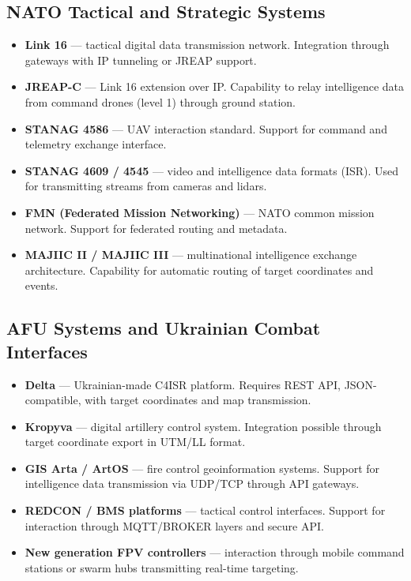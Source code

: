 \documentclass[12pt]{article}
\begin{document}
\subsection{NATO Tactical and Strategic Systems}
\begin{itemize}
    \item \textbf{Link 16} --- tactical digital data transmission network. Integration through gateways with IP tunneling or JREAP support.
    \item \textbf{JREAP-C} --- Link 16 extension over IP. Capability to relay intelligence data from command drones (level 1) through ground station.
    \item \textbf{STANAG 4586} --- UAV interaction standard. Support for command and telemetry exchange interface.
    \item \textbf{STANAG 4609 / 4545} --- video and intelligence data formats (ISR). Used for transmitting streams from cameras and lidars.
    \item \textbf{FMN (Federated Mission Networking)} --- NATO common mission network. Support for federated routing and metadata.
    \item \textbf{MAJIIC II / MAJIIC III} --- multinational intelligence exchange architecture. Capability for automatic routing of target coordinates and events.
\end{itemize}

\subsection{AFU Systems and Ukrainian Combat Interfaces}
\begin{itemize}
    \item \textbf{Delta} --- Ukrainian-made C4ISR platform. Requires REST API, JSON-compatible, with target coordinates and map transmission.
    \item \textbf{Kropyva} --- digital artillery control system. Integration possible through target coordinate export in UTM/LL format.
    \item \textbf{GIS Arta / ArtOS} --- fire control geoinformation systems. Support for intelligence data transmission via UDP/TCP through API gateways.
    \item \textbf{REDCON / BMS platforms} --- tactical control interfaces. Support for interaction through MQTT/BROKER layers and secure API.
    \item \textbf{New generation FPV controllers} --- interaction through mobile command stations or swarm hubs transmitting real-time targeting.
\end{itemize}
\end{document}
